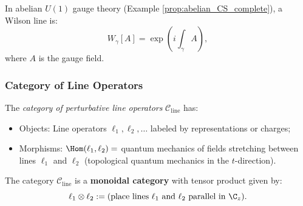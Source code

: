\begin{example}
In abelian $U(1)$ gauge theory (Example \ref{prop:abelian_CS_complete}), a Wilson line is:
\begin{equation}
W_\gamma[A] = \exp\left(i \int_\gamma A\right),
\end{equation}
where $A$ is the gauge field.
\end{example}

\subsubsection{Category of Line Operators}

\begin{definition}
\label{def:line_category}
The \emph{category of perturbative line operators} $\mathcal{C}_{\text{line}}$ has:
\begin{itemize}
\item Objects: Line operators $\ell_1, \ell_2, \ldots$ labeled by representations or charges;
\item Morphisms: $\Hom(\ell_1, \ell_2) = $ quantum mechanics of fields stretching between lines $\ell_1$ and $\ell_2$ (topological quantum mechanics in the $t$-direction).
\end{itemize}
\end{definition}

The category $\mathcal{C}_{\text{line}}$ is a \textbf{monoidal category} with tensor product given by:
\begin{equation}
\ell_1 \otimes \ell_2 := \text{(place lines $\ell_1$ and $\ell_2$ parallel in $\C_z$)}.
\end{equation}

